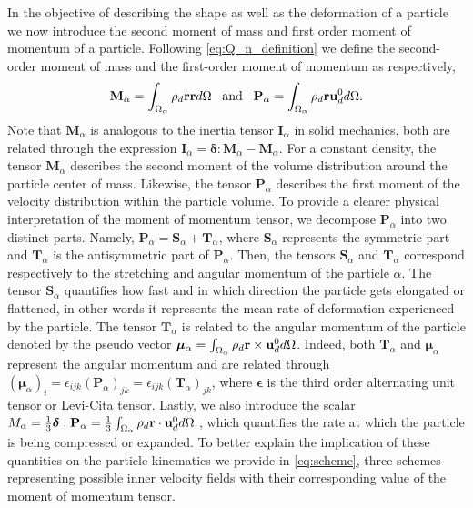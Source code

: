 In the objective of describing the shape as well as the deformation of a particle we now introduce the second moment of mass and first order moment of momentum of a particle. 
Following \ref{eq:Q_n_definition} we define the second-order moment of mass and the first-order moment of momentum as respectively,
\begin{equation}
    \textbf{M}_\alpha 
    = \int_{\Omega_{\alpha}}  \rho_d \textbf{r} \textbf{r}  d\Omega
    \;\;\;\text{and}\;\;\;
    \textbf{P}_\alpha 
    = \int_{\Omega_{\alpha}}  \rho_d \textbf{r} \textbf{u}_d^0  d\Omega.
    \label{eq:first_moment_of_momentum_def}
\end{equation}
Note that $\textbf{M}_\alpha$ is analogous to the inertia tensor $\textbf{I}_\alpha$ in solid mechanics, both are related through the expression $\textbf{I}_\alpha = \bm\delta : \textbf{M}_\alpha - \textbf{M}_\alpha$.
For a constant density, the tensor $\textbf{M}_\alpha$ describes the second moment of the volume distribution around the particle center of mass.
Likewise, the tensor $\textbf{P}_\alpha$ describes the first moment of the velocity distribution within the particle volume. 
To provide a clearer physical interpretation of the moment of momentum tensor, we decompose $\textbf{P}_\alpha$ into two distinct parts. 
Namely, 
$\textbf{P}_\alpha = \textbf{S}_\alpha+\textbf{T}_\alpha$, where $\textbf{S}_\alpha$ represents the symmetric part and $\textbf{T}_\alpha$ is the antisymmetric part of $\textbf{P}_\alpha$.
Then, the tensors $\textbf{S}_\alpha$ and $\textbf{T}_\alpha$ correspond respectively to the stretching and angular momentum of the particle $\alpha$. 
The tensor $\textbf{S}_\alpha$ quantifies how fast and in which direction the particle gets elongated or flattened, in other words it represents the mean rate of deformation experienced by the particle.
The tensor $\textbf{T}_\alpha$ is related to the angular momentum of the particle denoted by the pseudo vector $\bm\mu_\alpha = \int_{\Omega_{\alpha}}  \rho_d \textbf{r} \times \textbf{u}_d^0  d\Omega$. 
Indeed, both  $\textbf{T}_\alpha$ and $\bm{\mu}_\alpha$ represent the angular momentum and are related through $(\bm{\mu}_\alpha)_i = \epsilon_{ijk} (\textbf{P}_\alpha)_{jk}= \epsilon_{ijk} (\textbf{T}_\alpha)_{jk}$, where $\bm\epsilon$ is the third order alternating unit tensor or Levi-Cita tensor. 
Lastly, we also introduce the scalar $M_\alpha =\frac{1}{3}\bm\delta : \textbf{P}_\alpha = \frac{1}{3}\int_{\Omega_{\alpha}}  \rho_d \textbf{r} \cdot \textbf{u}_d^0  d\Omega.$, which quantifies the rate at which the particle is being compressed or expanded.
To better explain the implication of these quantities on the particle kinematics we provide in \ref{eq:scheme}, three schemes representing possible inner velocity fields with their corresponding value of the moment of momentum tensor.
